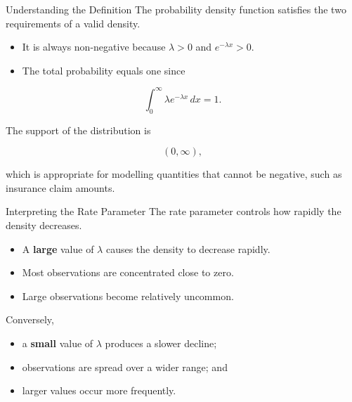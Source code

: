 \documentclass[
  ignorenonframetext,
  aspectratio=169,
]{beamer}
\providecommand{\tightlist}{%
  \setlength{\itemsep}{0pt}\setlength{\parskip}{0pt}}
\begin{document}
\begin{frame}{Understanding the Definition}
\protect{}\label{understanding-the-definition}
The probability density function satisfies the two requirements of a
valid density.

\begin{itemize}
\tightlist
\item
  It is always non-negative because \(\lambda>0\) and
  \(e^{-\lambda x}>0\).
\item
  The total probability equals one since
\end{itemize}

\[
\int_0^\infty \lambda e^{-\lambda x}\,dx=1.
\]

The support of the distribution is

\[
(0,\infty),
\]

which is appropriate for modelling quantities that cannot be negative,
such as insurance claim amounts.
\end{frame}

\begin{frame}{Interpreting the Rate Parameter}
\protect{}\label{interpreting-the-rate-parameter}
The rate parameter controls how rapidly the density decreases.

\begin{itemize}
\tightlist
\item
  A \textbf{large} value of \(\lambda\) causes the density to decrease
  rapidly.
\item
  Most observations are concentrated close to zero.
\item
  Large observations become relatively uncommon.
\end{itemize}

Conversely,

\begin{itemize}
\tightlist
\item
  a \textbf{small} value of \(\lambda\) produces a slower decline;
\item
  observations are spread over a wider range; and
\item
  larger values occur more frequently.
\end{itemize}
\end{frame}
\end{document}
